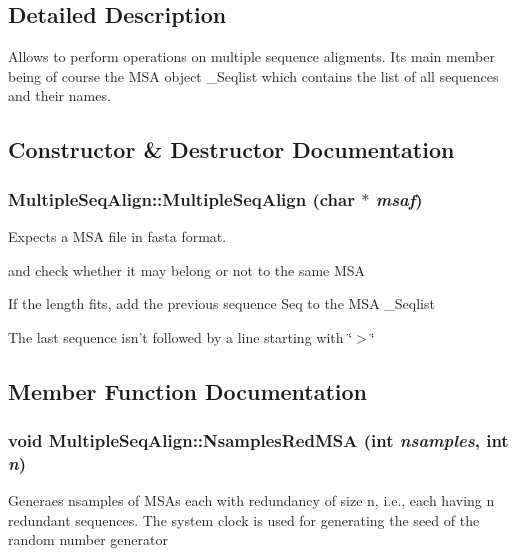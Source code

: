 \subsection{Detailed Description}
Allows to perform operations on multiple sequence aligments. Its main member being of course the MSA object \_\-Seqlist which contains the list of all sequences and their names. 



\subsection{Constructor \& Destructor Documentation}
\subsubsection{\setlength{\rightskip}{0pt plus 5cm}Multiple\-Seq\-Align::Multiple\-Seq\-Align (char $\ast$ {\em msaf})}\label{classMultipleSeqAlign_a1}


Expects a MSA file in fasta format. 

and check whether it may belong or not to the same MSA

If the length fits, add the previous sequence Seq to the MSA \_\-Seqlist

The last sequence isn't followed by a line starting with \char`\"{}$>$\char`\"{} 

\subsection{Member Function Documentation}
\subsubsection{\setlength{\rightskip}{0pt plus 5cm}void Multiple\-Seq\-Align::Nsamples\-Red\-MSA (int {\em nsamples}, int {\em n})}\label{classMultipleSeqAlign_a30}


Generaes nsamples of MSAs each with redundancy of size n, i.e., each having n redundant sequences. The system clock is used for generating the seed of the random number generator 
